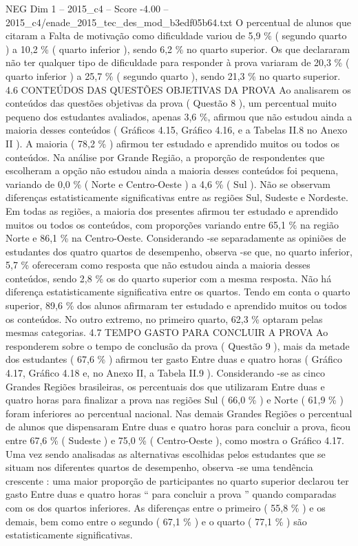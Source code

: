 \begin{textsample}{NEG Dim 1 – 2015\_c4 – Score -4.00 – 2015\_c4/enade\_2015\_tec\_des\_mod\_b3edf05b64.txt}
O percentual de alunos que citaram a Falta de motivação como dificuldade variou de 5,9 \% ( segundo quarto ) a 10,2 \% ( quarto inferior ), sendo 6,2 \% no quarto superior.
Os que declararam não ter qualquer tipo de dificuldade para responder à prova variaram de 20,3 \% ( quarto inferior ) a 25,7 \% ( segundo quarto ), sendo 21,3 \% no quarto superior. 4.6 CONTEÚDOS DAS QUESTÕES OBJETIVAS DA PROVA Ao analisarem os conteúdos das questões objetivas da prova ( Questão 8 ), um percentual muito pequeno dos estudantes avaliados, apenas 3,6 \%, afirmou que não estudou ainda a maioria desses conteúdos ( Gráficos 4.15, Gráfico 4.16, e a Tabelas II.8 no Anexo II ).
A maioria ( 78,2 \% ) afirmou ter estudado e aprendido muitos ou todos os conteúdos.
Na análise por Grande Região, a proporção de respondentes que escolheram a opção não estudou ainda a maioria desses conteúdos foi pequena, variando de 0,0 \% ( Norte e Centro-Oeste ) a 4,6 \% ( Sul ).
Não se observam diferenças estatisticamente significativas entre as regiões Sul, Sudeste e Nordeste.
Em todas as regiões, a maioria dos presentes afirmou ter estudado e aprendido muitos ou todos os conteúdos, com proporções variando entre 65,1 \% na região Norte e 86,1 \% na Centro-Oeste.
Considerando -se separadamente as opiniões de estudantes dos quatro quartos de desempenho, observa -se que, no quarto inferior, 5,7 \% ofereceram como resposta que não estudou ainda a maioria desses conteúdos, sendo 2,8 \% os do quarto superior com a mesma resposta.
Não há diferença estatisticamente significativa entre os quartos.
Tendo em conta o quarto superior, 89,6 \% dos alunos afirmaram ter estudado e aprendido muitos ou todos os conteúdos.
No outro extremo, no primeiro quarto, 62,3 \% optaram pelas mesmas categorias. 4.7 TEMPO GASTO PARA CONCLUIR A PROVA Ao responderem sobre o tempo de conclusão da prova ( Questão 9 ), mais da metade dos estudantes ( 67,6 \% ) afirmou ter gasto Entre duas e quatro horas ( Gráfico 4.17, Gráfico 4.18 e, no Anexo II, a Tabela II.9 ).
Considerando -se as cinco Grandes Regiões brasileiras, os percentuais dos que utilizaram Entre duas e quatro horas para finalizar a prova nas regiões Sul ( 66,0 \% ) e Norte ( 61,9 \% ) foram inferiores ao percentual nacional.
Nas demais Grandes Regiões o percentual de alunos que dispensaram Entre duas e quatro horas para concluir a prova, ficou entre 67,6 \% ( Sudeste ) e 75,0 \% ( Centro-Oeste ), como mostra o Gráfico 4.17.
Uma vez sendo analisadas as alternativas escolhidas pelos estudantes que se situam nos diferentes quartos de desempenho, observa -se uma tendência crescente : uma maior proporção de participantes no quarto superior declarou ter gasto Entre duas e quatro horas “ para concluir a prova ” quando comparadas com os dos quartos inferiores.
As diferenças entre o primeiro ( 55,8 \% ) e os demais, bem como entre o segundo ( 67,1 \% ) e o quarto ( 77,1 \% ) são estatisticamente significativas.

\end{textsample}
